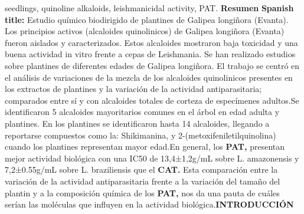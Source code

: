 \documentclass{article}
\begin{document}
{seedlings, quinoline alkaloids, leishmanicidal activity, PAT. }{\renewcommand{\children}{Resumen}\textbf{\children}
}{\renewcommand{\children}{Spanish title: }\textbf{\children}
Estudio químico biodirigido de plantines de Galipea longiñora (Evanta). Los principios activos (alcaloides quinolinicos) de Galipea longiñora (Evanta) fueron aislados y caracterizados. Estos alcaloides mostraron baja toxicidad y una buena actividad in vitro frente a cepas de Leishmania. Se han realizado estudios sobre plantines de diferentes edades de Galipea longiñora. El trabajo se centró en el análisis de variaciones de la mezcla de los alcaloides quinolinicos presentes en los extractos de plantines y la variación de la actividad antiparasitaria; comparados entre sí y con alcaloides totales de corteza de especímenes adultos.}{Se identificaron 5 alcaloides mayoritarios comunes en el árbol en edad adulta y plantines. En los plantines se identificaron hasta 14 alcaloides, llegando a reportarse compuestos como la: Shikimanina, y 2-(metoxifeniletilquinolina) cuando los plantines representan mayor edad.}{En general, los \renewcommand{\children}{PAT, }\textbf{\children}
presentan mejor actividad biológica con una IC50 de 13,4±1,2g/mL sobre L. amazonensis y 7,2±0.55g/mL sobre L. braziliensis que el \renewcommand{\children}{CAT. }\textbf{\children}
Esta comparación entre la variación de la actividad antiparasitaria frente a la variación del tamaño del plantin y a la composición química de los \renewcommand{\children}{PAT, }\textbf{\children}
nos da una pauta de cuáles serían las moléculas que influyen en la actividad biológica.}{\renewcommand{\children}{INTRODUCCIÓN}\textbf{\children}
}
\end{document}
